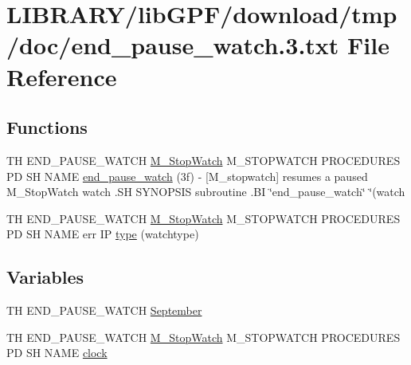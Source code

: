 \hypertarget{end__pause__watch_83_8txt}{}\section{L\+I\+B\+R\+A\+R\+Y/lib\+G\+P\+F/download/tmp/doc/end\+\_\+pause\+\_\+watch.3.txt File Reference}
\label{end__pause__watch_83_8txt}
\subsection*{Functions}
\begin{DoxyCompactItemize}
\item 
TH E\+N\+D\+\_\+\+P\+A\+U\+S\+E\+\_\+\+W\+A\+T\+CH \hyperlink{option__stopwatch_83_8txt_aa2011fc45a5e502e87ee50996a8a9305}{M\+\_\+\+Stop\+Watch} M\+\_\+\+S\+T\+O\+P\+W\+A\+T\+CH P\+R\+O\+C\+E\+D\+U\+R\+ES PD SH N\+A\+ME \hyperlink{end__pause__watch_83_8txt_aab2e2d273c44ad682568533e5099a62f}{end\+\_\+pause\+\_\+watch} (3f) -\/ \mbox{[}\+M\+\_\+stopwatch\mbox{]} resumes a paused M\+\_\+\+Stop\+Watch watch .\+S\+H S\+Y\+N\+O\+P\+S\+I\+S subroutine .\+B\+I \char`\"{}end\+\_\+pause\+\_\+watch\char`\"{} \char`\"{}(watch
\item 
TH E\+N\+D\+\_\+\+P\+A\+U\+S\+E\+\_\+\+W\+A\+T\+CH \hyperlink{option__stopwatch_83_8txt_aa2011fc45a5e502e87ee50996a8a9305}{M\+\_\+\+Stop\+Watch} M\+\_\+\+S\+T\+O\+P\+W\+A\+T\+CH P\+R\+O\+C\+E\+D\+U\+R\+ES PD SH N\+A\+ME err IP \hyperlink{end__pause__watch_83_8txt_a4519ce363764fb1188bbf48b67a49759}{type} (watchtype)
\end{DoxyCompactItemize}
\subsection*{Variables}
\begin{DoxyCompactItemize}
\item 
TH E\+N\+D\+\_\+\+P\+A\+U\+S\+E\+\_\+\+W\+A\+T\+CH \hyperlink{end__pause__watch_83_8txt_abe419b6cfb3e18ea312428eb58b25a14}{September}
\item 
TH E\+N\+D\+\_\+\+P\+A\+U\+S\+E\+\_\+\+W\+A\+T\+CH \hyperlink{option__stopwatch_83_8txt_aa2011fc45a5e502e87ee50996a8a9305}{M\+\_\+\+Stop\+Watch} M\+\_\+\+S\+T\+O\+P\+W\+A\+T\+CH P\+R\+O\+C\+E\+D\+U\+R\+ES PD SH N\+A\+ME \hyperlink{end__pause__watch_83_8txt_a872617f37ec8987521e3b8eb64ee451b}{clock}
\end{DoxyCompactItemize}



